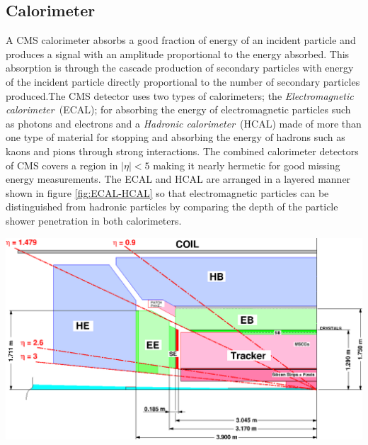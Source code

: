 \subsection{Calorimeter}
A CMS calorimeter absorbs a good fraction of energy of an incident particle and produces a signal with an amplitude proportional to the energy absorbed. This absorption is through the cascade production of secondary particles with energy of the incident particle directly proportional to the number of secondary particles produced.The CMS detector uses two types of calorimeters; the \textit{Electromagnetic calorimeter}~(ECAL); for absorbing the energy of electromagnetic particles such as photons and electrons and a \textit{Hadronic calorimeter}~(HCAL) made of more than one type of material for stopping and absorbing the energy of hadrons such as kaons and pions through strong interactions. The combined calorimeter detectors of CMS covers a region in $|\eta| < 5 $ making it nearly hermetic for good missing energy measurements. The ECAL and HCAL are arranged in a layered manner shown in figure \ref{fig:ECAL-HCAL} so that electromagnetic particles can be distinguished from hadronic particles by comparing the depth of the particle shower penetration in both calorimeters.

\begin{center}
\centering
\mbox{\includegraphics[scale=0.5]{THESISPLOTS/ECAL-HCAL.eps}} 
\label{fig:ECAL-HCAL}
\end{center}

